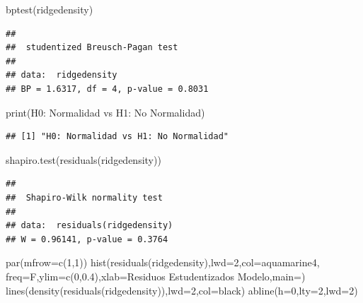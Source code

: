 \documentclass[
]{article}
\newenvironment{Shaded}{\begin{snugshade}}{\end{snugshade}}
\newcommand{\AttributeTok}[1]{\textcolor[rgb]{0.77,0.63,0.00}{#1}}
\newcommand{\DecValTok}[1]{\textcolor[rgb]{0.00,0.00,0.81}{#1}}
\newcommand{\FloatTok}[1]{\textcolor[rgb]{0.00,0.00,0.81}{#1}}
\newcommand{\FunctionTok}[1]{\textcolor[rgb]{0.00,0.00,0.00}{#1}}
\newcommand{\NormalTok}[1]{#1}
\newcommand{\StringTok}[1]{\textcolor[rgb]{0.31,0.60,0.02}{#1}}
\begin{document}
\begin{Shaded}
\begin{Highlighting}[]
\FunctionTok{bptest}\NormalTok{(ridgedensity)}
\end{Highlighting}
\end{Shaded}

\begin{verbatim}
## 
##  studentized Breusch-Pagan test
## 
## data:  ridgedensity
## BP = 1.6317, df = 4, p-value = 0.8031
\end{verbatim}

\begin{Shaded}
\begin{Highlighting}[]
\FunctionTok{print}\NormalTok{(}\StringTok{\textquotesingle{}H0: Normalidad vs H1: No Normalidad\textquotesingle{}}\NormalTok{)}
\end{Highlighting}
\end{Shaded}

\begin{verbatim}
## [1] "H0: Normalidad vs H1: No Normalidad"
\end{verbatim}

\begin{Shaded}
\begin{Highlighting}[]
\FunctionTok{shapiro.test}\NormalTok{(}\FunctionTok{residuals}\NormalTok{(ridgedensity))}
\end{Highlighting}
\end{Shaded}

\begin{verbatim}
## 
##  Shapiro-Wilk normality test
## 
## data:  residuals(ridgedensity)
## W = 0.96141, p-value = 0.3764
\end{verbatim}

\begin{Shaded}
\begin{Highlighting}[]
\FunctionTok{par}\NormalTok{(}\AttributeTok{mfrow=}\FunctionTok{c}\NormalTok{(}\DecValTok{1}\NormalTok{,}\DecValTok{1}\NormalTok{))}
\FunctionTok{hist}\NormalTok{(}\FunctionTok{residuals}\NormalTok{(ridgedensity),}\AttributeTok{lwd=}\DecValTok{2}\NormalTok{,}\AttributeTok{col=}\StringTok{\textquotesingle{}aquamarine4\textquotesingle{}}\NormalTok{,}
\AttributeTok{freq=}\NormalTok{F,}\AttributeTok{ylim=}\FunctionTok{c}\NormalTok{(}\DecValTok{0}\NormalTok{,}\FloatTok{0.4}\NormalTok{),}\AttributeTok{xlab=}\StringTok{\textquotesingle{}Residuos Estudentizados Modelo\textquotesingle{}}\NormalTok{,}\AttributeTok{main=}\StringTok{\textquotesingle{}\textquotesingle{}}\NormalTok{)}
\FunctionTok{lines}\NormalTok{(}\FunctionTok{density}\NormalTok{(}\FunctionTok{residuals}\NormalTok{(ridgedensity)),}\AttributeTok{lwd=}\DecValTok{2}\NormalTok{,}\AttributeTok{col=}\StringTok{\textquotesingle{}black\textquotesingle{}}\NormalTok{)}
\FunctionTok{abline}\NormalTok{(}\AttributeTok{h=}\DecValTok{0}\NormalTok{,}\AttributeTok{lty=}\DecValTok{2}\NormalTok{,}\AttributeTok{lwd=}\DecValTok{2}\NormalTok{)}
\end{Highlighting}
\end{Shaded}
\end{document}
